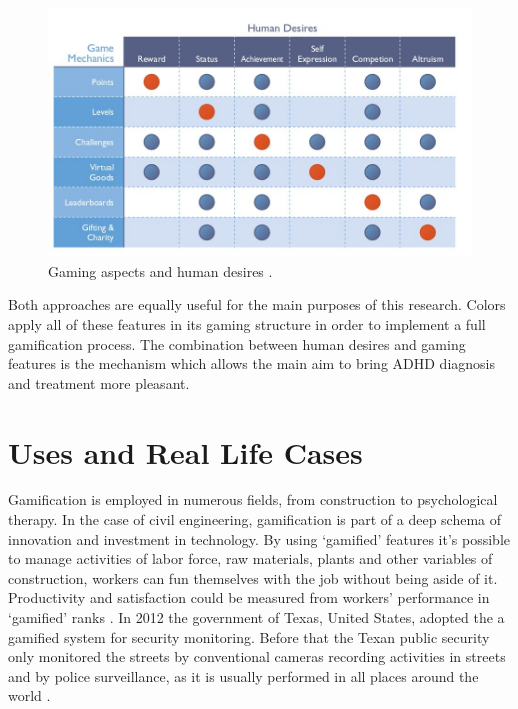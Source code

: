 \begin{figure}[h]
	\begin{center}
		\includegraphics[scale=0.5]{chapters/gamification/img/gaming.jpg}
		\caption{Gaming aspects and human desires \citep{Bunchball}.}
		\label{taxonomy_1}
	\end{center}
\end{figure}

Both approaches are equally useful for the main purposes of this research. Colors apply all of these features in its gaming structure in order to implement a full gamification process. The combination between human desires and gaming features is the mechanism which allows the main aim to bring ADHD diagnosis and treatment more pleasant.


\section{Uses and Real Life Cases}

Gamification is employed in numerous fields, from construction to psychological therapy.  In the case of civil engineering, gamification is part of a deep schema of innovation and investment in technology. By using `gamified' features it's possible to manage activities of labor force, raw materials, plants and other variables of construction, workers can fun themselves with the job without being aside of it. Productivity and satisfaction could be measured from workers' performance in `gamified' ranks  \citep{formoso}. In 2012 the government of Texas, United States, adopted the a gamified system for security monitoring. Before that the Texan public security only monitored the streets by conventional cameras recording activities in streets and by police surveillance, as it is usually performed in all places around the world \citep{conf/cts/Aud13}.

